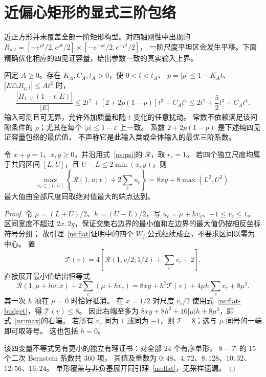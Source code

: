 \section{近偏心矩形的显式三阶包络}\label{nr:section}

近正方形并未覆盖全部一阶矩形构型。对四轴刚性中出现的
$R_{\rho,t}=[-e^{\rho t}/2,e^{\rho t}/2]\times[-e^{-\rho t}/2,e^{-\rho t}/2]$，
一阶尺度平坦区会发生平移。下面精确优化相应的四见证容量，给出参数一致的真实输入上界。

\begin{theorem}[有间隙的近矩形上界]\label{nr:main}
固定 $A\ge0$。存在 $K_A,C_A,t_A>0$，使 $0<t<t_A$、
$p=|\rho|\le1-K_At$、$|E\triangle R_{\rho,t}|\le At^2$ 时，
\begin{equation}\label{nr:upper}
 \frac{|H_{1,\mathcal Q_c}(1-t,E)|}{|E|}
 \le2t^2+[2+2p(1-p)]t^3+C_At^4
 \le2t^2+\frac52t^3+C_At^4.
\end{equation}
输入可测且可无界，允许外加质量和随 $t$ 变化的任意扰动。
常数不依赖满足该间隙条件的 $\rho$；尤其在每个 $|\rho|\le1-\varepsilon$ 上一致。
系数 $2+2p(1-p)$ 是下述纯四见证容量包络的最优值，
不声称它是此输入类或全体输入的最优三阶系数。
\end{theorem}

\begin{lemma}[共同尺度区间上的精确容量极值]\label{nr:interval}
令 $x+y=1$、$x,y\ge0$，并沿用式~\eqref{ns:psi}的 $\mathcal R$，取 $r_c=1$。
若四个独立尺度均属于共同区间 $[L,U]$，且 $U-L\le2\min(x,y)$，则
\begin{equation}\label{nr:max}
 \max_{u_c\in[L,U]}\left\{\mathcal R(1,u;x)+2\sum_cu_c\right\}
 =8xy+8\max(L^2,U^2).
\end{equation}
最大值由全部尺度同取绝对值最大的端点达到。
\end{lemma}

\begin{proof}
令 $\mu=(L+U)/2$、$h=(U-L)/2$，写 $u_c=\mu+hv_c$、$-1\le v_c\le1$。
区间宽度不超过 $2x,2y$，保证交集右边界的最小值和左边界的最大值仍按相反坐标符号分组；
故引理~\ref{ns:flat}证明中的四个 $W_j$ 公式继续成立，不要求区间以零为中心。
置
\[
 \mathcal T(v)=4\left[\mathcal R(1,v/2;1/2)+\sum_cv_c-2\right].
\]
直接展开最小值给出恒等式
\begin{equation}\label{nr:shift}
 \mathcal R(1,\mu+hv;x)+2\sum_c(\mu+hv_c)
 =8xy+h^2\mathcal T(v)+4\mu h\sum_cv_c+8\mu^2.
\end{equation}
其一次 $h$ 项在 $\mu=0$ 时恰好抵消。
在 $x=1/2$ 对尺度 $v_c/2$ 使用式~\eqref{ns:flat-budget}，得 $\mathcal T(v)\le8$。
因此右端至多为 $8xy+8h^2+16|\mu|h+8\mu^2$，即式~\eqref{nr:max}的右端。
若所有 $v_c$ 同为 $1$ 或同为 $-1$，则 $\mathcal T=8$；选与 $\mu$ 同号的一端即可取等号。
这也包括 $h=0$。

该四变量不等式另有更小的独立有理证书：对全部 $24$ 个有序单形，
$8-\mathcal T$ 的 $15$ 个二次 Bernstein 系数共 $360$ 项，
其值及重数为 $0:48$、$4:72$、$8:128$、$10:32$、$12:56$、$16:24$。
单形覆盖与非负基展开同引理~\ref{ns:flat}，无采样遗漏。
\end{proof}

